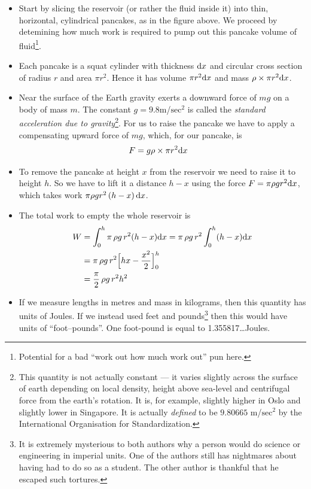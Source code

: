 \begin{eg}
\begin{itemize}
 \item Start by slicing the reservoir (or rather the fluid inside it) into thin,
horizontal, cylindrical pancakes, as in the figure above. We proceed by detemining how
much work is required to pump out this pancake volume of fluid\footnote{Potential for a
bad ``work out how much work out'' pun here.}.
\item Each pancake is a squat cylinder with thickness $\mathrm{d}x$ and circular cross
section of radius $r$ and area $\pi r^2$. Hence it has volume $\pi r^2 \mathrm{d}x$ and mass
$\rho \times \pi r^2\mathrm{d}x$.
\item Near the surface of the Earth gravity exerts a downward force of
$mg$ on a body of mass $m$. The constant $g=9.8$m/$\mathrm{sec}^2$
is called the \emph{standard acceleration due to gravity}\footnote{This quantity is not
actually constant --- it varies slightly across the surface of earth depending on local
density, height above sea-level and centrifugal force from the earth's rotation. It
is, for example, slightly higher in Oslo and slightly lower in Singapore. It is
actually \emph{defined} to be $9.80665$ m/$\mathrm{sec}^2$ by the International
Organisation for Standardization.}. For us to raise the pancake we have to apply a
compensating upward force of $mg$, which, for our pancake, is
\begin{align*}
  F &= g \rho \times \pi r^2\mathrm{d}x
\end{align*}
\item To remove the pancake at height $x$ from the reservoir we need to
raise it to height $h$. So we have to lift it a distance $h-x$ using the force $F=\pi \rho
g r^2\mathrm{d}x$, which takes work $ \pi\rho g r^2\,(h-x)\, \mathrm{d}x$.

\item The total work to empty the whole reservoir is
\begin{align*}
W&= \int_0^h \pi\,\rho g\,r^2 (h-x)\mathrm{d}x
= \pi\,\rho g\,r^2 \int_0^h  (h-x)\mathrm{d}x \\
&=\pi\,\rho g\,r^2  \Big[hx -\frac{x^2}{2}\Big]_0^h \\
&=\frac{\pi}{2}\,\rho g\, r^2 h^2
\end{align*}
\item If we measure lengths in metres and mass in kilograms, then this
quantity has units of Joules. If we instead used feet and pounds\footnote{%
It is extremely mysterious to both authors why a person would do science
or engineering in imperial units. One of the authors still has nightmares
about having had to do so as a student. The other
author is thankful that he escaped such tortures.} then this would
have units of ``foot--pounds''. One foot-pound is equal to
1.355817\dots Joules.
\end{itemize}

\end{eg}




